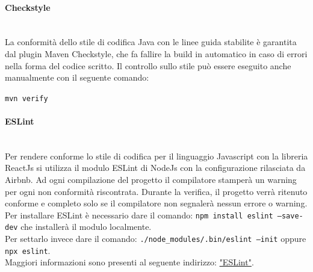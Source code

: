 \paragraph{Checkstyle}\mbox{}\\
La conformità dello stile di codifica Java con le linee guida stabilite è garantita dal plugin Maven Checkstyle, che fa fallire la build in automatico in caso di errori nella forma del codice scritto. Il controllo sullo stile può essere eseguito anche manualmente con il seguente comando:
\begin{center}
	\texttt{mvn verify}
\end{center}

\paragraph{ESLint}\mbox{}\\
Per rendere conforme lo stile di codifica per il linguaggio Javascript con la libreria ReactJs si utilizza il modulo ESLint di NodeJs con la configurazione rilasciata da Airbnb. Ad ogni compilazione del progetto il compilatore stamperà un warning per ogni non conformità riscontrata. Durante la verifica, il progetto verrà ritenuto conforme e completo solo se il compilatore non segnalerà nessun errore o warning.\\
Per installare ESLint è necessario dare il comando: \texttt{npm install eslint --save-dev} che installerà il modulo localmente.\\
Per settarlo invece dare il comando: \texttt{./node\_modules/.bin/eslint --init} oppure \texttt{npx eslint}.\\
Maggiori informazioni sono presenti al seguente indirizzo: \href{https://eslint.org/}{"ESLint"}.

